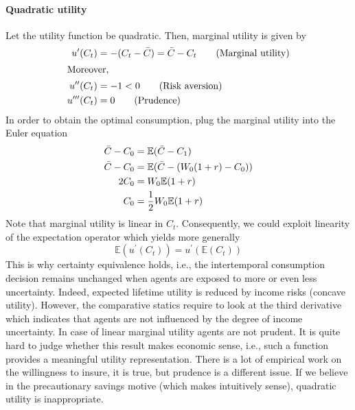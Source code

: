 \documentclass{article}
\begin{document}
\paragraph{Quadratic utility}
Let the utility function be quadratic. Then, marginal utility is given by
\begin{align*}
u^\prime(C_t) &= -(C_t - \bar{C}) = \bar{C} - C_t \tag{Marginal utility}\\
\intertext{Moreover,}
u^{\prime\prime}(C_t) &= -1 < 0 \tag{Risk aversion}\\
u^{\prime\prime\prime}(C_t) &= 0 \tag{Prudence}
\end{align*}
In order to obtain the optimal consumption, plug the marginal utility into the Euler equation
\begin{align*}
\bar{C} - C_0 &= \mathbb{E}(\bar{C} - C_1) \notag \\
\bar{C} - C_0 &= \mathbb{E}(\bar{C} - (W_0 (1+r) - C_0)) \notag \\
2 C_0 &= W_0 \mathbb{E}(1+r) \notag \\
C_0 &= \frac{1}{2} W_0 \mathbb{E}(1+r) \notag
\end{align*}
Note that marginal utility is linear in $C_t$. Consequently, we could exploit linearity of the expectation operator which yields more generally
\begin{equation*}
\mathbb{E}(u^\prime(C_t)) = u^\prime(\mathbb{E}(C_t))
\end{equation*}
This is why certainty equivalence holds, i.e., the intertemporal consumption decision remains unchanged when agents are exposed to more or even less uncertainty. Indeed, expected lifetime utility is reduced by income risks (concave utility). However, the comparative statics require to look at the third derivative which indicates that agents are not influenced by the degree of income uncertainty. In case of linear marginal utility agents are not prudent. It is quite hard to judge whether this result makes economic sense, i.e., such a function provides a meaningful utility representation. There is a lot of empirical work on the willingness to insure, it is true, but prudence is a different issue. If we believe in the precautionary savings motive (which makes intuitively sense), quadratic utility is inappropriate.
\end{document}
